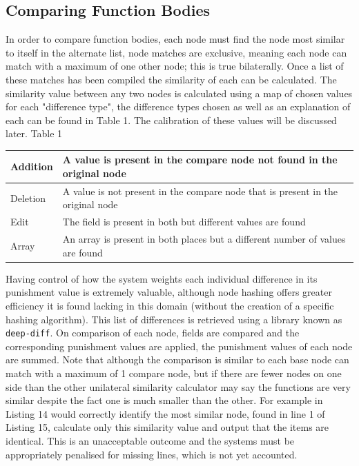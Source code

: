 \documentclass[jou,apacite]{apa6}
\begin{document}
\subsection{Comparing Function Bodies}
In order to compare function bodies, each node must find the node most similar to itself in the alternate list, node matches are exclusive, meaning each node can match with a maximum of one other node; this is true bilaterally. Once a list of these matches has been compiled the similarity of each can be calculated. The similarity value between any two nodes is calculated using a map of chosen values for each "difference type", the difference types chosen as well as an explanation of each can be found in Table 1.  The calibration of these values will be discussed later.
\newline\newline
Table 1
\begin{tabular}{l|p{50mm}}
  \hline
  Addition & A value is present in the compare
    node not found in the original node\\
  \hline
  Deletion & A value is not present in the compare node that is present in the original node\\
  \hline
  Edit & The field is present in both but different values are found\\
  \hline
  Array & An array is present in both places but a different number of values are found\\
  \hline
\end{tabular}
\newline\newline

Having control of how the system weights each individual difference in its punishment value is extremely valuable, although node hashing offers greater efficiency it is found lacking in this domain (without the creation of a specific hashing algorithm). This list of differences is retrieved using a library known as \texttt{deep-diff}. On comparison of each node, fields are compared and the corresponding punishment values are applied, the punishment values of each node are summed. Note that although the comparison is similar to each base node can match with a maximum of 1 compare node, but if there are fewer nodes on one side than the other unilateral similarity calculator may say the functions are very similar despite the fact one is much smaller than the other. For example in Listing 14 would correctly identify the most similar node, found in line 1 of Listing 15, calculate only this similarity value and output that the items are identical. This is an unacceptable outcome and the systems must be appropriately penalised for missing lines, which is not yet accounted.
\end{document}
